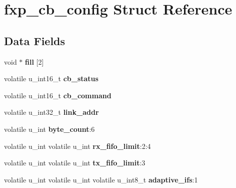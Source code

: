 \hypertarget{structfxp__cb__config}{}\section{fxp\+\_\+cb\+\_\+config Struct Reference}
\label{structfxp__cb__config}
\subsection*{Data Fields}
\begin{DoxyCompactItemize}
\item 
\mbox{\label{structfxp__cb__config_a712c1e0ad5d899950f1b3703632ec1d1}} 
void $\ast$ {\bfseries fill} \mbox{[}2\mbox{]}
\item 
\mbox{\label{structfxp__cb__config_ae896a8fda9ff274eac79e9b38cdad1b5}} 
volatile u\+\_\+int16\+\_\+t {\bfseries cb\+\_\+status}
\item 
\mbox{\label{structfxp__cb__config_af9516bf632e55d53730f93e6908f8fdf}} 
volatile u\+\_\+int16\+\_\+t {\bfseries cb\+\_\+command}
\item 
\mbox{\label{structfxp__cb__config_a2758d87e894be1092c078e1c0c239e40}} 
volatile u\+\_\+int32\+\_\+t {\bfseries link\+\_\+addr}
\item 
\mbox{\label{structfxp__cb__config_ae5f097314abde032fa3d7fbf908b3c88}} 
volatile u\+\_\+int {\bfseries byte\+\_\+count}\+:6
\item 
\mbox{\label{structfxp__cb__config_a4c7834ca80d6ebb7015270985ebc24ee}} 
volatile u\+\_\+int volatile u\+\_\+int {\bfseries rx\+\_\+fifo\+\_\+limit}\+:2\+:4
\item 
\mbox{\label{structfxp__cb__config_a14583950751f8bfcc507305558f4fb0a}} 
volatile u\+\_\+int volatile u\+\_\+int {\bfseries tx\+\_\+fifo\+\_\+limit}\+:3
\item 
\mbox{\label{structfxp__cb__config_a4631d780f2aa687eb2daff43cf7ac465}} 
volatile u\+\_\+int volatile u\+\_\+int volatile u\+\_\+int8\+\_\+t {\bfseries adaptive\+\_\+ifs}\+:1

\end{DoxyCompactItemize}
